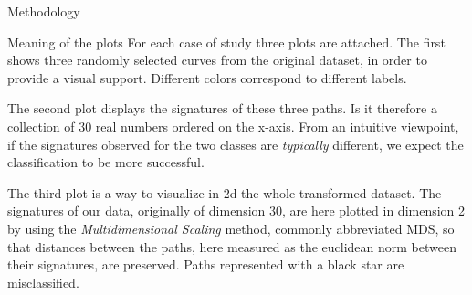\documentclass[twocolumn,9pt]{article}
\theoremstyle{definition}
\theoremstyle{remark}
\begin{document}
\begin{section}{Methodology}
\begin{subsection}{Meaning of the plots}
For each case of study three plots are attached.
The first shows three randomly selected curves from the original dataset,
in order to provide a visual support.
Different colors correspond to different labels.


The second plot displays the signatures of these three paths.
Is it therefore a collection of $30$ real numbers 
ordered on the x-axis. From an intuitive viewpoint,
if the signatures observed for the two classes are
\emph{typically} different, we expect the classification to be more
successful.


The third plot is a way to visualize in 2d the whole transformed dataset.
The signatures of our data, originally of dimension $30$, are here
plotted in dimension 2 by using the 
\emph{Multidimensional Scaling} method, commonly abbreviated MDS, so that
distances between the paths, here measured as the euclidean norm between
their signatures, are preserved. Paths represented with a black star
are misclassified. 
\end{subsection}
\end{section}
\end{document}

